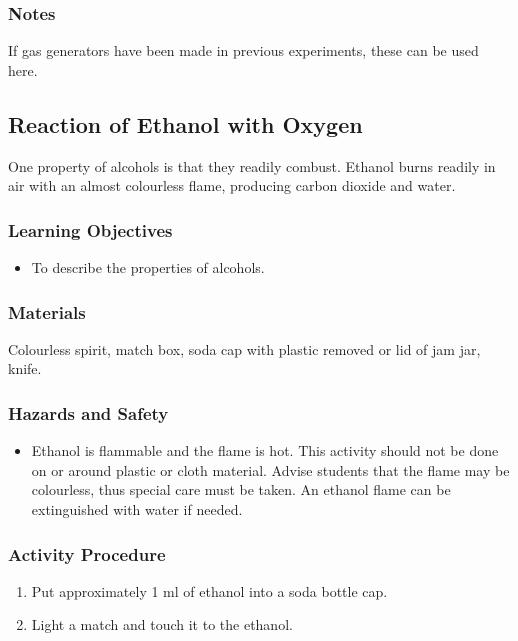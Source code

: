\subsubsection*{Notes}
If gas generators have been made in previous experiments, these can be used here.

\subsection{Reaction of Ethanol with Oxygen}

One property of alcohols is that they readily combust. Ethanol burns readily in air with an almost colourless flame, producing carbon dioxide and water.

\subsubsection*{Learning Objectives}
\begin{itemize}
\item{To describe the properties of alcohols.}
\end{itemize}

\subsubsection*{Materials}
Colourless spirit, match box, soda cap with plastic removed or lid of jam jar, knife.

\subsubsection*{Hazards and Safety}
\begin{itemize}
\item{Ethanol is flammable and the flame is hot. This activity should not be done on or around plastic or cloth material. Advise students that the flame may be colourless, thus special care must be taken. An ethanol flame can be extinguished with water if needed.}
\end{itemize}

\subsubsection*{Activity Procedure}
\begin{enumerate}
\item{Put approximately 1 ml of ethanol into a soda bottle cap.}
\item{Light a match and touch it to the ethanol.}
\end{enumerate}

